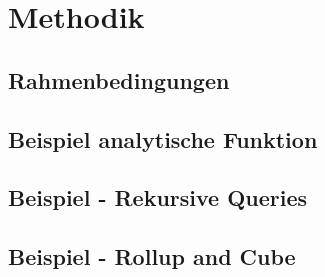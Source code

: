 \chapter{Methodik}

\section{Rahmenbedingungen}

\section{Beispiel analytische Funktion}

\section{Beispiel - Rekursive Queries}

\section{Beispiel - Rollup and Cube}